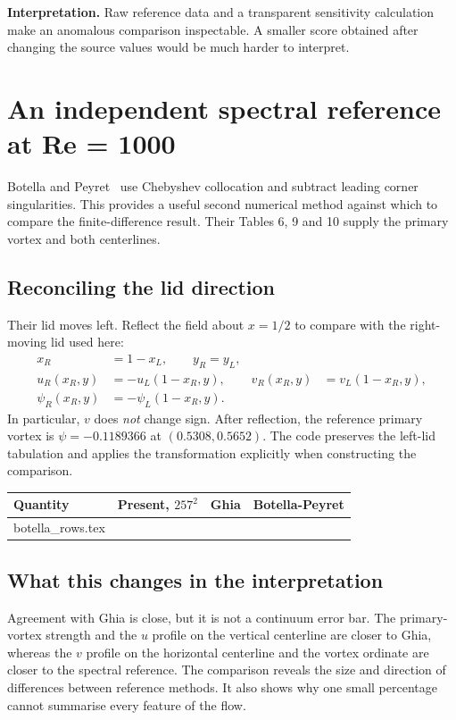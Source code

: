 \documentclass[11pt,a4paper]{article}
\makeatletter
\newcommand{\tableinput}[1]{\@@input #1 }
\newcommand{\takeaway}[1]{\par\smallskip\noindent\colorbox{teal!7}{\parbox{\dimexpr\linewidth-2\fboxsep}{\textbf{\color{teal}Interpretation.} #1}}\par\smallskip}
\makeatother
\begin{document}
\takeaway{Raw reference data and a transparent sensitivity calculation make
an anomalous comparison inspectable. A smaller score obtained after changing
the source values would be much harder to interpret.}

\clearpage
\section{An independent spectral reference at Re = 1000}
Botella and Peyret~\cite{botella1998} use Chebyshev collocation and subtract
leading corner singularities. This provides a useful second numerical method
against which to compare the finite-difference result. Their Tables 6, 9 and
10 supply the primary vortex and both centerlines.

\subsection{Reconciling the lid direction}
Their lid moves left. Reflect the field about $x=1/2$ to compare with the
right-moving lid used here:
\begin{align}
x_R&=1-x_L,\qquad y_R=y_L,\\
u_R(x_R,y)&=-u_L(1-x_R,y),&v_R(x_R,y)&=v_L(1-x_R,y),\\
\psi_R(x_R,y)&=-\psi_L(1-x_R,y).
\end{align}
In particular, $v$ does \emph{not} change sign. After reflection, the reference
primary vortex is $\psi=-0.1189366$ at $(0.5308,0.5652)$.
The code preserves the left-lid tabulation and applies the transformation
explicitly when constructing the comparison.

\begin{center}
\begin{tabular}{@{}lrrr@{}}\toprule
Quantity & Present, $257^2$ & Ghia & Botella-Peyret\\\midrule
\tableinput{botella_rows.tex}
\bottomrule
\end{tabular}
\end{center}

\subsection{What this changes in the interpretation}
Agreement with Ghia is close, but it is not a continuum error bar. The
primary-vortex strength and the $u$ profile on the vertical centerline are
closer to Ghia, whereas the $v$ profile on the horizontal centerline and the
vortex ordinate are closer to the spectral reference. The comparison reveals the
size and direction of differences between reference methods. It also shows
why one small percentage cannot summarise every feature of the flow.
\end{document}

